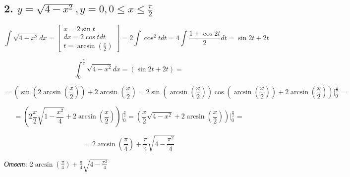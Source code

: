 \documentclass[a4paper]{article}
\begin{document}
\subsection*{2. $y = \sqrt{4-x^2}, y=0, 0 \leq x \leq \frac{\pi}{2}$}

\[ \int \sqrt{4-x^2} dx  = \begin{bmatrix}
x = 2\sin t \\ dx = 2 \cos t dt \\ t = \arcsin(\frac{x}{2})
\end{bmatrix} = 2 \int \cos^2 t dt = 4 \int \frac{1+\cos 2t}{2} dt = \sin 2t + 2t
\] 

\[\int_0^\frac{\pi}{2} \sqrt{4-x^2} dx = (\sin 2t + 2t) = 
\] 

\[ =
\left( \sin \left( 2 \arcsin \left( \frac{x}{2}\right) \right) + 2 \arcsin \left( \frac{x}{2} \right) = 2 \sin \left( \arcsin \left( \frac{x}{2} \right) \right) \cos \left( \arcsin \left( \frac{x}{2}\right) \right) + 2 \arcsin \left( \frac{x}{2} \right) \right) \bigg|_0^\frac{\pi}{2} = 
\]

\[
= \left( 2 \frac{x}{2} \sqrt{1-\frac{x^2}{4}} + 2 \arcsin \left( \frac{x}{2} \right) \right) \bigg|_0^\frac{\pi}{2}
= \left( \frac{x}{2} \sqrt{4-x^2} + 2 \arcsin \left( \frac{x}{2} \right) \right) \bigg|_0^\frac{\pi}{2}
=
\]

\[
=
2 \arcsin \left( \frac{\pi}{4} \right) + \frac{\pi}{4} \sqrt{4 - \frac{\pi^2}{4}}
\]

\textit{Ответ: $2 \arcsin \left( \frac{\pi}{4} \right) + \frac{\pi}{4} \sqrt{4 - \frac{\pi^2}{4}}$}
\end{document}
